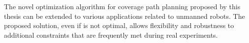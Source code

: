 


The novel optimization algorithm for coverage path planning proposed by this thesis can be extended to various applications related to unmanned robots. The proposed solution, even if is not optimal, allows flexibility and robustness to additional constraints that are frequently met during real experiments.



